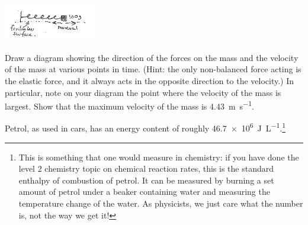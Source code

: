 \documentclass[answers]{exam}
\begin{document}
\begin{questions}
\begin{parts}
            \includegraphics[width=0.3\textwidth]{2spring2}
        \begin{subparts}
          \subpart Draw a diagram showing the direction of the forces on the mass and the velocity of the mass at various points in time. (Hint: the
                   only non-balanced force acting is the elastic force, and it always acts in the opposite direction to the velocity.) In particular, note
                   on your diagram the point where the velocity of the mass is largest.
          \subpart Show that the maximum velocity of the mass is \SI{4.43}{\metre\per\second}.
        \end{subparts}
    \end{parts}
  \clearpage
  \question Petrol, as used in cars, has an energy content of roughly \SI{46.7e6}{\joule\per\liter}.\footnote{This is something that one
            would measure in chemistry: if you have done the level 2 chemistry topic on chemical reaction rates, this is the standard
            enthalpy of combustion of petrol. It can be measured by burning a set amount of petrol under a beaker containing water
            and measuring the temperature change of the water. As physicists, we just care what the number is, not the way we get it!}
\end{questions}
\end{document}
